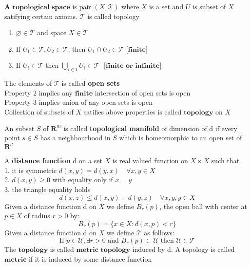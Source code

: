\documentclass{article}
\begin{document}
\begin{defn}
    $\textbf{A topological space}$ is pair $(X, \mathcal{T})$ where $X$ is a set and $U$ is subset of $X$ satifying certain axioms. $\mathcal{T}$ is called topology
    \begin{enumerate}
        \item $\varnothing \in \mathcal{T}$ and space $X \in \mathcal{T}$ 
        \item If $U_1 \in \mathcal{T}, U_2 \in \mathcal{T}$, then $U_1 \cap U_2 \in \mathcal{T}$ $\textbf{[finite]}$ 
        \item If $U_i \in \mathcal{T}$ then $\bigcup_{i \in I} U_i \in \mathcal{T}$ $\textbf{ [finite or infinite]}$ 
    \end{enumerate}
\end{defn}

\noindent
The elements of $\mathcal{T}$ is called \textbf{open sets} \\
Property $\mathit{2}$ implies any $\mathbf{finite}$ intersection of open sets is open \\
Property $\mathit{3}$ implies union of any open sets is open \\
Collection of subsets of $X$ satifies above properties is called $\textbf{topology}$ on $X$ \\

\begin{defn}
    An subset $S$ of $\mathbf{R}^m$ is called \textbf{topological manifold} of dimension of d if every point $s \in S$ has a neighbourhood in $S$ which is homeomorphic to an open set of $\mathbf{R}^d$
\end{defn}

\begin{defn}
    A \textbf{distance function} d on a set $X$ is real valued function on $X \times X$ such that \\
    1. it is symmetric $d(x, y) = d(y, x) \quad \forall x, y \in X$ \\
    2. $d(x, y) \geq 0 $ with equality only if $x = y$ \\
    3. the triangle equality holds  
    \[ d(x, z) \leq d(x, y) + d(y, z) \quad \forall x, y, y \in X \]
    Given a distance function d on $X$ we define $B_r(p)$, the open ball with center at $p \in X$ of radius $r > 0$ by:\\
    \[ B_r(p) = \{x \in X : d(x, p) < r\} \]
    Given a distance function d on $X$ we define $\mathcal{T}$ as follows:
    \[ \text{If } p \in \mathcal{U}, \exists r > 0 \text{ and } B_r(p) \subset \mathcal{U} \text{ then } \mathcal{U} \in \mathcal{T} \]
    The $\textbf{topology}$ is called $\textbf{metric topology}$ induced by d. A topology is called $\textbf{metric}$ if it is induced by some distance function
\end{defn}
\end{document}
